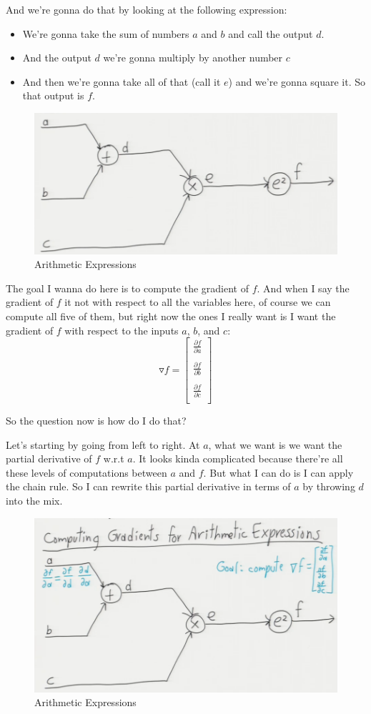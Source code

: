 \documentclass[fleqn,10pt]{olplainarticle}
\theoremstyle{definition}
\theoremstyle{remark}
\begin{document}
And we're gonna do that by looking at the following expression: 
\begin{itemize}
\item We're gonna take the sum of numbers $a$ and $b$ and call the output $d$.
\item And the output $d$ we're gonna multiply by another number $c$
\item And then we're gonna take all of that (call it $e$) and we're gonna square it. So that output is $f$.
\end{itemize}
\begin{figure}[ht]
\centering
\includegraphics[width=0.5\linewidth]{images/arithmetic_expression}
\caption{Arithmetic Expressions}
\label{fig:arithmetic_expression}
\end{figure}

The goal I wanna do here is to compute the gradient of $f$. And when I say the gradient of $f$ it not with respect to all the variables here, of course we can compute all five of them, but right now the ones I really want is I want the gradient of $f$ with respect to the inputs $a$, $b$, and $c$:
$$\triangledown f = 
\begin{bmatrix}
\frac{\partial f}{\partial a} \\
\\
\frac{\partial f}{\partial b} \\
\\
\frac{\partial f}{\partial c} \\
\end{bmatrix}$$

So the question now is how do I do that?

Let's starting by going from left to right. At $a$, what we want is we want the partial derivative of $f$ w.r.t $a$. It looks kinda complicated because there're all these levels of computations between $a$ and $f$. But what I can do is I can apply the chain rule. So I can rewrite this partial derivative in terms of $a$ by throwing $d$ into the mix. 
\begin{figure}[ht]
\centering
\includegraphics[width=0.7\linewidth]{images/arithmetic_expression_1}
\caption{Arithmetic Expressions}
\label{fig:arithmetic_expression_1}
\end{figure}
\end{document}
